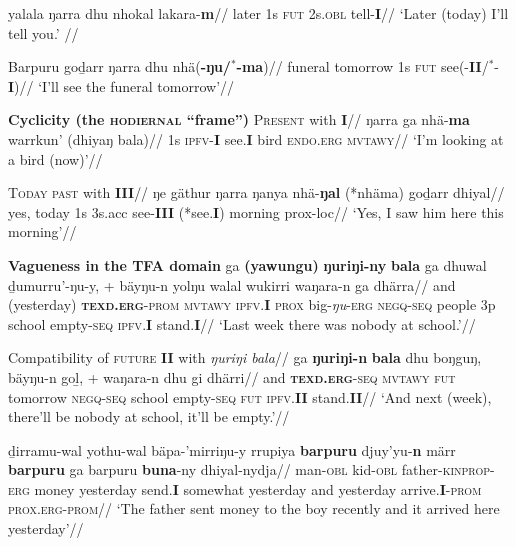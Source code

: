\documentclass[11pt,dvipsnames]{article}
\newcommand{\gls}{\textsc}
\begin{document}
\a{}\begingl\gla yalala ŋarra dhu nhokal lakara-\textbf{m}//
\glb later 1s \textsc{fut} 2s\textsc{.obl} tell-\textbf{I}//
\glft `Later (today) I'll tell you.' //\endgl

 \a\begingl{}\gla Barpuru goḏarr ŋarra dhu nhä(\textbf{-ŋu/$^*$-ma})//
\glb funeral tomorrow 1s \gls{fut} see(-\textbf{II}/$^*$-\textbf{I})//
\glft `I'll see the funeral tomorrow'\trailingcitation{[AW~20180730]}//\endgl
\xe


\pex\textbf{Cyclicity (the \textsc{hodiernal} ``frame'')}
\a{}\begingl\glpreamble\textsc{Present} with \textbf{I}//
\gla ŋarra ga nhä-\textbf{ma} warrkun' (dhiyaŋ bala)//
\glb 1s \textsc{ipfv}-\textbf{I} see.\textbf{I} bird \textsc{endo}.\textsc{erg} \textsc{mvtawy}//
\glft`I'm looking at a bird (now)'//
\endgl

\a{}\begingl\glpreamble\textsc{Today past} with \textbf{III}//
\gla ŋe gäthur ŋarra ŋanya nhä-\textbf{ŋal} (*nhäma) goḏarr dhiyal//
\glb	yes, today 1s 3s{\sc.acc} see-\textbf{III} (*see.\textbf{I}) morning {\sc prox-loc}//
\glft`Yes, I saw him here this morning'//\endgl

\xe

\pex\textbf{Vagueness in the TFA domain}
\a\begingl\gla ga \textbf{(yawungu)} \textbf{ŋuriŋi-ny} \textbf{bala} ga dhuwal ḏumurru'-ŋu-y, + bäyŋu-n yolŋu walal wukirri waŋara-n ga dhärra//
\glb and (yesterday) \textbf{\gls{texd}.\gls{erg}}-\gls{prom} \gls{mvtawy} \gls{ipfv}.\textbf{I} \gls{prox} big-\textit{ŋu}-\gls{erg} \gls{negq}-\gls{seq} people 3p school empty-\gls{seq} \gls{ipfv}.\textbf{I} stand.\textbf{I}//
\glft`Last week there was nobody at school.'//\endgl

\a{}\begingl Compatibility of \textsc{future} \textbf{II} with \textit{ŋuriŋi bala}\glpreamble//
\gla ga \textbf{ŋuriŋi-n} \textbf{bala} dhu boŋguŋ, bäyŋu-n goḻ, + waŋara-n dhu gi dhärri//
\glb and \textbf{\gls{texd}.\gls{erg}}-\gls{seq} \gls{mvtawy} \gls{fut} tomorrow  \gls{negq}-\gls{seq} school empty-\gls{seq} \gls{fut} \gls{ipfv}.\textbf{II} stand.\textbf{II}//
\glft`And next (week), there'll be nobody at school, it'll be empty.'//\endgl
	
\a	\begingl\gla ḏirramu-wal yothu-wal bäpa-'mirriŋu-y rrupiya \textbf{barpuru} djuy'yu-\textbf{n} märr \textbf{barpuru} ga barpuru \textbf{buna}-ny dhiyal-nydja//
\glb man-\gls{obl} kid-\gls{obl} father-\gls{kinprop}-\textsc{erg} money yesterday send.\textbf{I} somewhat yesterday and yesterday arrive.\textbf{I}-\textsc{prom} \gls{prox}.\gls{erg}-\gls{prom}//
\glft`The father sent money to the boy recently and it arrived here yesterday'//\endgl
\xe
\end{document}
